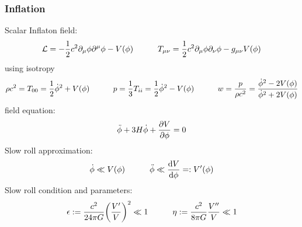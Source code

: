 		\subsubsection{Inflation}
			Scalar Inflaton field:
			\begin{equation}
				\mathcal{L} = -\frac{1}{2}c^2 \partial_\mu \phi \partial^\mu \phi - V(\phi)
				\hspace{30pt}
				T_{\mu\nu} = \frac{1}{2} c^2 \partial_\mu \phi \partial_\nu \phi - g_{\mu\nu} V(\phi)
			\end{equation}
			using isotropy
			\begin{equation}
				\rho c^2 = T_{00} = \frac{1}{2} \dot{\phi}^2 + V(\phi)
				\hspace{30pt}
				p = \frac{1}{3} T_{ii} = \frac{1}{2} \dot{\phi}^2 - V(\phi)
				\hspace{30pt}
				w = \frac{p}{\rho c^2} = \frac{\dot{\phi}^2 - 2V(\phi)}{\dot{\phi}^2 + 2V(\phi)}
			\end{equation}
			field equation:
			\begin{equation}
				\ddot{\phi} + 3 H \dot{\phi} + \pdv{V}{\phi} = 0
			\end{equation}
			Slow roll approximation:
			\begin{equation}
				\dot{\phi} \ll V(\phi) 
				\hspace{30pt}
				\ddot{\phi} \ll \dv{V}{\phi} =: V'(\phi)			
			\end{equation}
			Slow roll condition and parameters:
			\begin{equation}
				\epsilon := \frac{c^2}{24\pi G} \qty(\frac{V'}{V})^2 \ll 1
				\hspace{30pt}
				\eta := \frac{c^2}{8\pi G} \frac{V''}{V} \ll 1
			\end{equation}